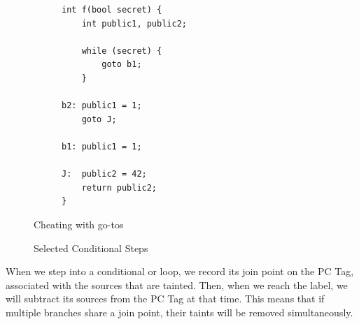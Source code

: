 \documentclass[acmsmall,review,anonymous]{acmart}\settopmatter{printfolios=true,printccs=false,printacmref=false}
\begin{document}
\begin{figure}
  \begin{subfigure}{0.25\textwidth}
\begin{verbatim}
int f(bool secret) {
    int public1, public2;

    while (secret) {
        goto b1;
    }

b2: public1 = 1;
    goto J;

b1: public1 = 1;

J:  public2 = 42;
    return public2;
}
\end{verbatim}
  \end{subfigure}
  \begin{subfigure}{0.74\textwidth}
  \end{subfigure}
  
  \caption{Cheating with go-tos}
  \label{fig:forbreak}
\end{figure}

\begin{figure}
  \ifstepb
  
  \whiletruestep
  \whilefalsestep
  \whileskipcontinuestep
  \whilebreakstep


  \caption{Selected Conditional Steps}
  \label{fig:conditionals}
\end{figure}


When we step into a conditional or loop, we record its join point on the PC Tag, associated with the sources
that are tainted. Then, when we reach the label, we will subtract its sources from the PC Tag at that time.
This means that if multiple branches share a join point, their taints will be removed simultaneously.
\end{document}
